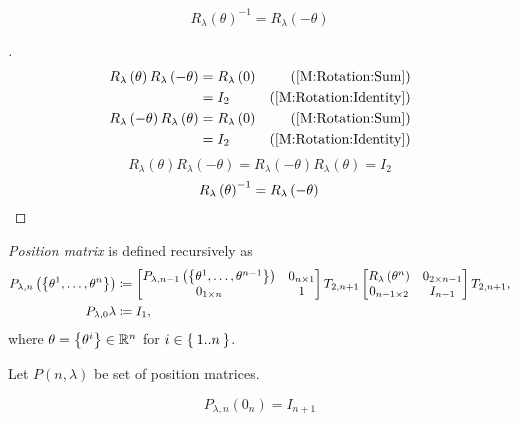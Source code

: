 \documentclass[../main.tex]{subfiles}
\begin{document}
\begin{corollary}\label{M:Rotation:Inverse}
\[
R_\lambda\left(\theta\right)^{-1}=R_\lambda\left(-\theta\right)
\]
\end{corollary}
\begin{proof}[]
\begin{align*}
R_\lambda\left(\theta\right)
R_\lambda\left(-\theta\right)
&=R_\lambda\left(0\right)&\text{(\cref{M:Rotation:Sum})}\\
&=I_2&\text{(\cref{M:Rotation:Identity})}\\
R_\lambda\left(-\theta\right)
R_\lambda\left(\theta\right)
&=R_\lambda\left(0\right)&\text{(\cref{M:Rotation:Sum})}\\
&=I_2&\text{(\cref{M:Rotation:Identity})}
\end{align*}
\[
R_\lambda\left(\theta\right)R_\lambda\left(-\theta\right)
=R_\lambda\left(-\theta\right)R_\lambda\left(\theta\right)
=I_2
\]
\[
{R_\lambda\left(\theta\right)}^{-1}
=
R_\lambda\left(-\theta\right)
\qedhere
\]
\end{proof}
\begin{definition}\label{M:Position}
\textit{Position matrix} is defined recursively as
\begin{align*}
P_{\lambda,n}\left(\left\{\tensor{\theta}{^1},\dots,\tensor{\theta}{^n}\right\}\right)
&\coloneqq
\begin{bmatrix}
P_{\lambda,n-1}\left(\left\{\tensor{\theta}{^1},\dots,\tensor{\theta}{^{n-1}}\right\}\right)&0_{n\times 1}\\
0_{1\times n}&1\\
\end{bmatrix}
T_{2,n+1}
\begin{bmatrix}
R_\lambda\left(\tensor{\theta}{^n}\right)&0_{{2}\times{n-1}}\\
0_{{n-1}\times{2}}&{I}_{n-1}\\
\end{bmatrix}
T_{2,n+1}\text{,}\\
P_{\lambda,0}
\lambda&\coloneqq I_1\text{,}
\end{align*}
where \(\theta=\left\{\tensor{\theta}{^i}\right\}\in\R^n\) for \(i\in\Set{1..n}\).
\end{definition}
\begin{definition}\label{M:Position:Set}
Let \(P\left(n,\lambda\right)\) be set of position matrices.
\end{definition}
\begin{corollary}\label{M:Position:Set:Identity}
\[
P_{\lambda,n}
\left(0_{n}\right)
=
I_{n+1}
\]
\end{corollary}
\end{document}
